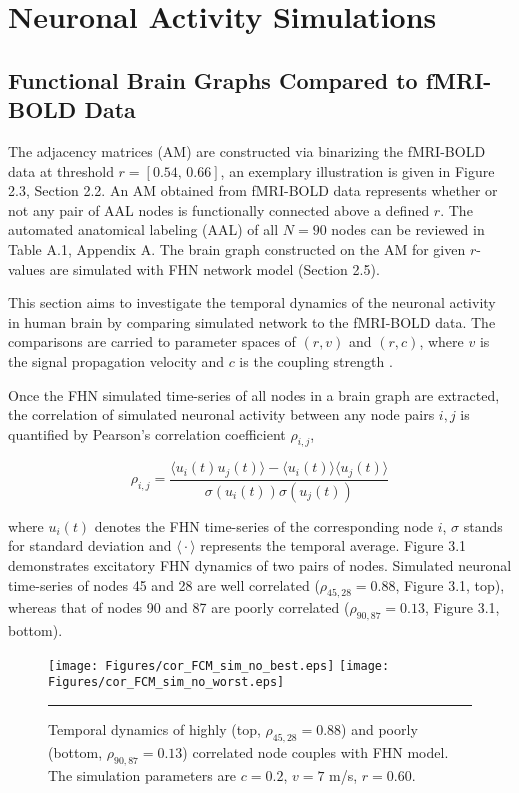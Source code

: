 \section{Neuronal Activity Simulations}

\subsection{Functional Brain Graphs Compared to fMRI-BOLD Data}

The adjacency matrices (AM) are constructed via binarizing the fMRI-BOLD data at threshold $r=[0.54, \, 0.66]$, an exemplary illustration is given in Figure 2.3, Section 2.2. An AM obtained from fMRI-BOLD data represents whether or not any pair of AAL nodes is functionally connected above a defined $r$. The automated anatomical labeling (AAL) of all $N=90$ nodes can be reviewed in Table A.1, Appendix A. The brain graph constructed on the AM for given $r$-values are simulated with FHN network model (Section 2.5). 

This section aims to investigate the temporal dynamics of the neuronal activity in human brain by comparing simulated network to the fMRI-BOLD data. The comparisons are carried to parameter spaces of $(r,v)$ and $(r,c)$, where $v$ is the signal propagation velocity and $c$ is the coupling strength \citep{VUK13, GHO08a}.  

Once the FHN simulated time-series of all nodes in a brain graph are extracted, the correlation of simulated neuronal activity between any node pairs $i,j$ is quantified by Pearson's correlation coefficient $\rho_{i,j}$, 

\begin{equation}
\rho_{i,j} = \dfrac{\big \langle u_i(t) u_{j}(t) \big \rangle - \big \langle u_{i}(t) \big \rangle  \big \langle u_{j}(t) \big \rangle}{ \sigma (u_i(t)) \sigma (u_j(t))}
\end{equation}

where $u_i(t)$ denotes the FHN time-series of the corresponding node $i$,  $\sigma$ stands for standard deviation and $\big \langle \cdot \big \rangle$ represents the temporal average. Figure 3.1 demonstrates excitatory FHN dynamics of two pairs of nodes. Simulated neuronal time-series of nodes 45 and 28 are well correlated ($\rho_{45,28}=0.88$, Figure 3.1, top), whereas that of nodes 90 and 87 are poorly correlated ($\rho_{90,87}=0.13$, Figure 3.1, bottom).

\begin{figure}[htbp]
 
  \centering
	 \texttt{[image: Figures/cor\_FCM\_sim\_no\_best.eps]} 
   	 \texttt{[image: Figures/cor\_FCM\_sim\_no\_worst.eps]} 

    \rule{35em}{0.5pt}
  \caption[Neural Activity Node Dynamics, FCM]{Temporal dynamics of highly (top, $\rho_{45,28}=0.88$) and poorly (bottom, $\rho_{90,87}=0.13$) correlated node couples with FHN model. The simulation parameters are $c=0.2$, $v=7$ m/s, $r=0.60$.} 
    \label{fig:Neural Activity Node Dynamics, FCM}
 	
\end{figure} 



